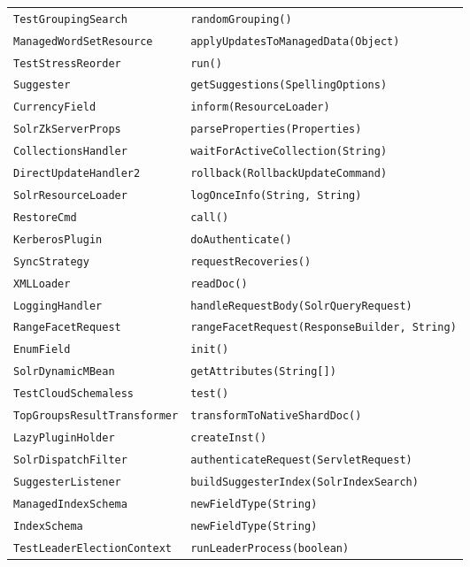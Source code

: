 \begin{center}
\begin{longtable}{ll}
\lstinline/TestGroupingSearch/&{\lstinline/randomGrouping()/}\\
\lstinline/ManagedWordSetResource/&{\lstinline/applyUpdatesToManagedData(Object)/}\\
\lstinline/TestStressReorder/&{\lstinline/run()/}\\
\lstinline/Suggester/&{\lstinline/getSuggestions(SpellingOptions)/}\\
\lstinline/CurrencyField/&{\lstinline/inform(ResourceLoader)/}\\
\lstinline/SolrZkServerProps/&{\lstinline/parseProperties(Properties)/}\\
\lstinline/CollectionsHandler/&{\lstinline/waitForActiveCollection(String)/}\\
\lstinline/DirectUpdateHandler2/&{\lstinline/rollback(RollbackUpdateCommand)/}\\
\lstinline/SolrResourceLoader/&{\lstinline/logOnceInfo(String, String)/}\\
\lstinline/RestoreCmd/&{\lstinline/call()/}\\
\lstinline/KerberosPlugin/&{\lstinline/doAuthenticate()/}\\
\lstinline/SyncStrategy/&{\lstinline/requestRecoveries()/}\\
\lstinline/XMLLoader/&{\lstinline/readDoc()/}\\
\lstinline/LoggingHandler/&{\lstinline/handleRequestBody(SolrQueryRequest)/}\\
\lstinline/RangeFacetRequest/&{\lstinline/rangeFacetRequest(ResponseBuilder, String)/}\\
\lstinline/EnumField/&{\lstinline/init()/}\\
\lstinline/SolrDynamicMBean/&{\lstinline/getAttributes(String[])/}\\
\lstinline/TestCloudSchemaless/&{\lstinline/test()/}\\
\lstinline/TopGroupsResultTransformer/&{\lstinline/transformToNativeShardDoc()/}\\
\lstinline/LazyPluginHolder/&{\lstinline/createInst()/}\\
\lstinline/SolrDispatchFilter/&{\lstinline/authenticateRequest(ServletRequest)/}\\
\lstinline/SuggesterListener/&{\lstinline/buildSuggesterIndex(SolrIndexSearch)/}\\
\lstinline/ManagedIndexSchema/&{\lstinline/newFieldType(String)/}\\
\lstinline/IndexSchema/&{\lstinline/newFieldType(String)/}\\
\lstinline/TestLeaderElectionContext/&{\lstinline/runLeaderProcess(boolean)/}\\

\end{longtable}
\end{center}
